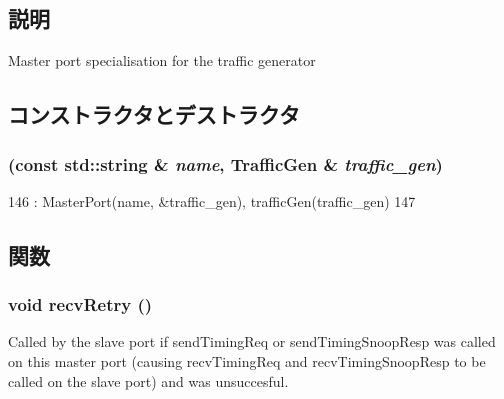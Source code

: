 \subsection{説明}
Master port specialisation for the traffic generator 

\subsection{コンストラクタとデストラクタ}
\hypertarget{classTrafficGen_1_1TrafficGenPort_ab821bf413d7688aa99f497180808208c}{
\subsubsection[{TrafficGenPort}]{ (const std::string \& {\em name}, \/  {\bf TrafficGen} \& {\em traffic\_\-gen})}}
\label{classTrafficGen_1_1TrafficGenPort_ab821bf413d7688aa99f497180808208c}



\begin{DoxyCode}
146             : MasterPort(name, &traffic_gen), trafficGen(traffic_gen)
147         { }
\end{DoxyCode}


\subsection{関数}
\hypertarget{classTrafficGen_1_1TrafficGenPort_a29cb5a4f98063ce6e9210eacbdb35298}{
\subsubsection[{recvRetry}]{\setlength{\rightskip}{0pt plus 5cm}void recvRetry ()}}
\label{classTrafficGen_1_1TrafficGenPort_a29cb5a4f98063ce6e9210eacbdb35298}
Called by the slave port if sendTimingReq or sendTimingSnoopResp was called on this master port (causing recvTimingReq and recvTimingSnoopResp to be called on the slave port) and was unsuccesful. 

